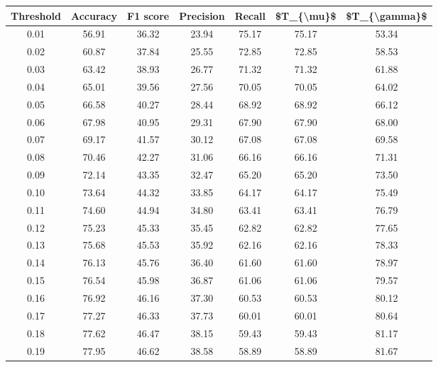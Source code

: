 \begin{tabular}{|c|c|c|c|c|c|c|}
\toprule
 Threshold &  Accuracy &  F1 score &  Precision &  Recall &  \$T\_\{\textbackslash mu\}\$ &  \$T\_\{\textbackslash gamma\}\$ \\
\hline
      0.01 &     56.91 &     36.32 &      23.94 &   75.17 &      75.17 &         53.34 \\
      0.02 &     60.87 &     37.84 &      25.55 &   72.85 &      72.85 &         58.53 \\
      0.03 &     63.42 &     38.93 &      26.77 &   71.32 &      71.32 &         61.88 \\
      0.04 &     65.01 &     39.56 &      27.56 &   70.05 &      70.05 &         64.02 \\
      0.05 &     66.58 &     40.27 &      28.44 &   68.92 &      68.92 &         66.12 \\
      0.06 &     67.98 &     40.95 &      29.31 &   67.90 &      67.90 &         68.00 \\
      0.07 &     69.17 &     41.57 &      30.12 &   67.08 &      67.08 &         69.58 \\
      0.08 &     70.46 &     42.27 &      31.06 &   66.16 &      66.16 &         71.31 \\
      0.09 &     72.14 &     43.35 &      32.47 &   65.20 &      65.20 &         73.50 \\
      0.10 &     73.64 &     44.32 &      33.85 &   64.17 &      64.17 &         75.49 \\
      0.11 &     74.60 &     44.94 &      34.80 &   63.41 &      63.41 &         76.79 \\
      0.12 &     75.23 &     45.33 &      35.45 &   62.82 &      62.82 &         77.65 \\
      0.13 &     75.68 &     45.53 &      35.92 &   62.16 &      62.16 &         78.33 \\
      0.14 &     76.13 &     45.76 &      36.40 &   61.60 &      61.60 &         78.97 \\
      0.15 &     76.54 &     45.98 &      36.87 &   61.06 &      61.06 &         79.57 \\
      0.16 &     76.92 &     46.16 &      37.30 &   60.53 &      60.53 &         80.12 \\
      0.17 &     77.27 &     46.33 &      37.73 &   60.01 &      60.01 &         80.64 \\
      0.18 &     77.62 &     46.47 &      38.15 &   59.43 &      59.43 &         81.17 \\
      0.19 &     77.95 &     46.62 &      38.58 &   58.89 &      58.89 &         81.67 \\

\end{tabular}
